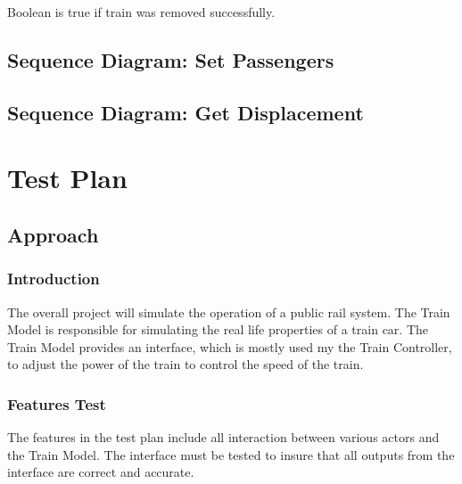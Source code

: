 \documentclass{scrreprt}
\begin{document}
Boolean is true if train was removed successfully.

\subsection{Sequence Diagram: Set Passengers}
\begin{center}
\end{center}

\subsection{Sequence Diagram: Get Displacement}
\begin{center}
\end{center}



\section{Test Plan}
\subsection{Approach}

\subsubsection{Introduction}
The overall project will simulate the operation of a public rail system. The Train Model is responsible for simulating the real life properties of a train car. The Train Model provides an interface, which is mostly used my the Train Controller, to adjust the power of the train to control the speed of the train.

\subsubsection{Features Test}
The features in the test plan include all interaction between various actors and the Train Model. The interface must be tested to insure that all outputs from the interface are correct and accurate.
\end{document}
